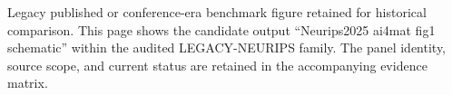 Legacy published or conference-era benchmark figure retained for historical comparison. This page shows the candidate output ``Neurips2025 ai4mat fig1 schematic'' within the audited LEGACY-NEURIPS family. The panel identity, source scope, and current status are retained in the accompanying evidence matrix.
